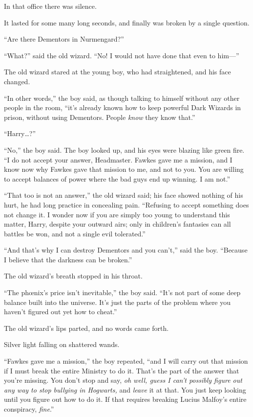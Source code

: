 In that office there was silence.

It lasted for some many long seconds, and finally was broken by a single question.

“Are there Dementors in Nurmengard?”

“What?” said the old wizard. “No! I would not have done that even to him—”

\later

The old wizard stared at the young boy, who had straightened, and his face changed.

“In other words,” the boy said, as though talking to himself without any other people in the room, “it’s already known how to keep powerful Dark Wizards in prison, without using Dementors. People \emph{know} they know that.”

“Harry…?”

“No,” the boy said. The boy looked up, and his eyes were blazing like green fire. “I do not accept your answer, Headmaster. Fawkes gave me a mission, and I know now why Fawkes gave that mission to me, and not to you. You are willing to accept balances of power where the bad guys end up winning. I am not.”

“That too is not an answer,” the old wizard said; his face showed nothing of his hurt, he had long practice in concealing pain. “Refusing to accept something does not change it. I wonder now if you are simply too young to understand this matter, Harry, despite your outward airs; only in children’s fantasies can all battles be won, and not a single evil tolerated.”

“And that’s why I can destroy Dementors and you can’t,” said the boy. “Because I believe that the darkness can be broken.”

The old wizard’s breath stopped in his throat.

“The phœnix’s price isn’t inevitable,” the boy said. “It’s not part of some deep balance built into the universe. It’s just the parts of the problem where you haven’t figured out yet how to cheat.”

The old wizard’s lips parted, and no words came forth.

Silver light falling on shattered wands.

“Fawkes gave me a mission,” the boy repeated, “and I will carry out that mission if I must break the entire Ministry to do it. That’s the part of the answer that you’re missing. You don’t stop and say, \emph{oh well, guess I can’t possibly figure out any way to stop bullying in Hogwarts,} and \emph{leave} it at that. You just keep looking until you figure out how to do it. If that requires breaking Lucius Malfoy’s entire conspiracy, \emph{fine}.”

